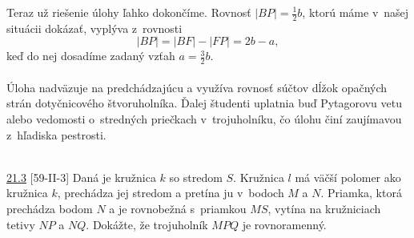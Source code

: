 Teraz už riešenie úlohy ľahko dokončíme. Rovnosť $|BP| =\frac{1}{2}b$, ktorú máme v~našej situácii dokázať, vyplýva z~rovnosti
$$|BP| = |BF| - |FP| = 2b -a,$$
keď do nej dosadíme zadaný vzťah $a=\frac{3}{2}b$.\\
\\
\kom Úloha nadväzuje na predchádzajúcu a využíva rovnosť súčtov dĺžok opačných strán dotyčnicového štvoruholníka. Ďalej študenti uplatnia buď Pytagorovu vetu alebo vedomosti o~stredných priečkach v~trojuholníku, čo úlohu činí zaujímavou z~hľadiska pestrosti.\\
\\
\begin{tcolorbox}[breakable,notitle,boxrule=0pt,colback=light-gray,colframe=light-gray]\ul{21.3} [59-II-3]  Daná je kružnica $k$ so stredom $S$. Kružnica $l$ má väčší polomer ako kružnica $k$, prechádza jej stredom a pretína ju v~bodoch $M$ a $N$. Priamka, ktorá prechádza bodom $N$ a je rovnobežná s~priamkou $MS$, vytína na kružniciach tetivy $NP$ a $NQ$. Dokážte, že trojuholník $MPQ$ je rovnoramenný.

\end{tcolorbox}

